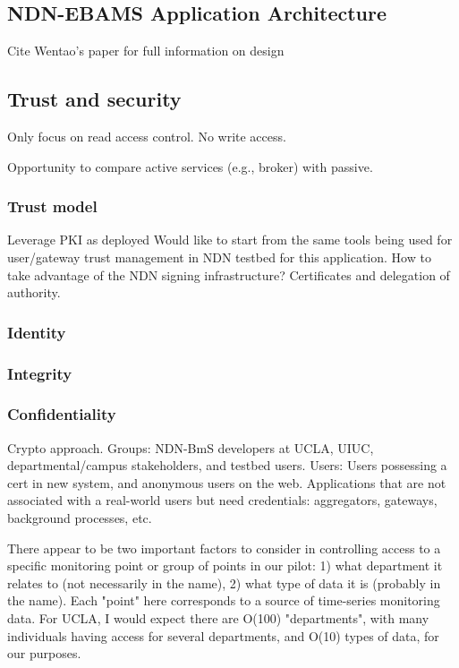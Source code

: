 \subsection{NDN-EBAMS Application Architecture} 
 
Cite Wentao's paper for full information on design

  
 \subsection{Trust and security}
 
Only focus on read access control. No write access.

Opportunity to compare active services (e.g., broker) with passive. 

\subsubsection{Trust model} 
Leverage PKI as deployed
Would like to start from the same tools being used for user/gateway trust management in NDN testbed for this application.  
How to take advantage of the NDN signing infrastructure?
Certificates and delegation of authority.

\subsubsection{Identity} 

\subsubsection{Integrity} 

\subsubsection{Confidentiality}
Crypto approach.
Groups: NDN-BmS developers at UCLA, UIUC, departmental/campus stakeholders, and testbed users. 
Users:  Users possessing a cert in new system, and anonymous users on the web.
Applications that are not associated with a real-world users but need credentials: aggregators, gateways, background processes, etc. 

There appear to be two important factors to
consider in controlling access to a specific monitoring point or group of
points in our pilot: 1) what department it relates to (not necessarily in the name),
2) what type of data it is (probably in the name).
Each "point" here corresponds to a source of time-series monitoring data.
For UCLA, I would expect there are O(100) "departments", with many
individuals having access for several departments, and O(10) types of
data, for our purposes.


